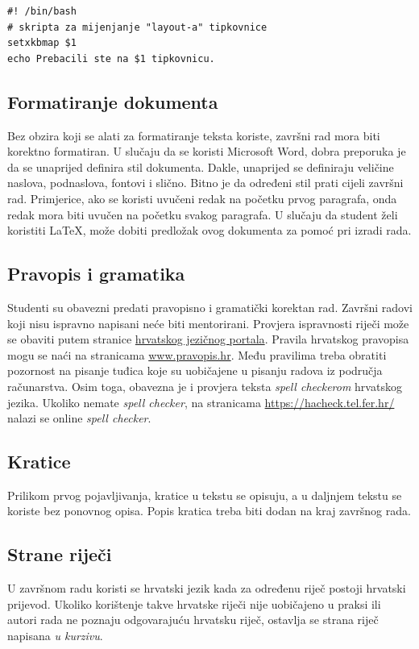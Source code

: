 \begin{lstlisting}[caption={Skripta za mijenjanje rasporeda tipki tipkovnice}, label=program]
#! /bin/bash
# skripta za mijenjanje "layout-a" tipkovnice
setxkbmap $1
echo Prebacili ste na $1 tipkovnicu.
\end{lstlisting}



\subsection{Formatiranje dokumenta}

Bez obzira koji se alati za formatiranje teksta koriste, završni rad mora biti korektno formatiran. U slučaju da se koristi Microsoft Word, 
dobra preporuka je da se unaprijed definira 
stil dokumenta. Dakle, unaprijed se definiraju veličine naslova, podnaslova, fontovi i slično. Bitno je da određeni stil prati cijeli završni rad. 
Primjerice, ako se koristi 
uvučeni redak na početku prvog paragrafa, onda redak mora biti uvučen na početku svakog paragrafa.
U slučaju da student želi koristiti \LaTeX, može dobiti predložak ovog dokumenta za pomoć pri izradi rada.
\subsection{Pravopis i gramatika}

Studenti su obavezni predati pravopisno i gramatički korektan rad. Završni radovi koji nisu ispravno napisani neće biti mentorirani. Provjera ispravnosti riječi može se obaviti putem stranice \href{http://hjp.novi-liber.hr/}{hrvatskog jezičnog portala}. Pravila hrvatskog pravopisa mogu se naći na stranicama \href{www.pravopis.hr}{www.pravopis.hr}. Među pravilima treba obratiti pozornost na pisanje tuđica koje su uobičajene u pisanju radova iz područja računarstva. Osim toga, obavezna je i provjera teksta \textit{spell checkerom} hrvatskog jezika. Ukoliko nemate \textit{spell checker}, na stranicama \url{https://hacheck.tel.fer.hr/} nalazi se online \textit{spell checker}.
\subsection{Kratice}

Prilikom prvog pojavljivanja, kratice u tekstu se opisuju, a u daljnjem tekstu se koriste bez ponovnog opisa. Popis kratica treba biti dodan na kraj završnog rada.
\subsection{Strane riječi}
U završnom radu koristi se hrvatski jezik kada za određenu riječ postoji hrvatski prijevod. Ukoliko korištenje takve hrvatske riječi nije 
uobičajeno u praksi ili autori rada ne 
poznaju odgovarajuću hrvatsku riječ, ostavlja se strana riječ napisana \textit{u kurzivu}.

